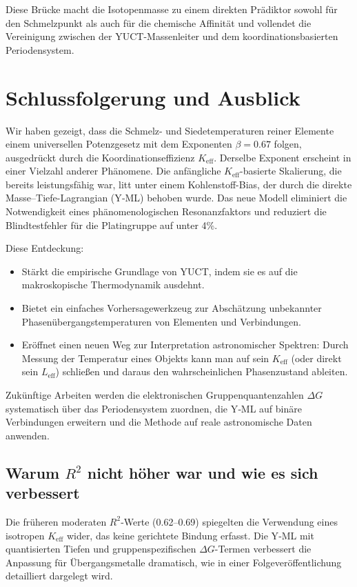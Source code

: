 \documentclass[12pt,a4paper]{article}
\theoremstyle{remark}
\newcommand{\Keff}{K_{\mathrm{eff}}}
\newcommand{\be}{\beta}               %
\begin{document}
	Diese Brücke macht die Isotopenmasse zu einem direkten Prädiktor sowohl für den Schmelzpunkt als auch für die chemische Affinität und vollendet die Vereinigung zwischen der YUCT-Massenleiter und dem koordinationsbasierten Periodensystem.
	
	\section{Schlussfolgerung und Ausblick}
	Wir haben gezeigt, dass die Schmelz- und Siedetemperaturen reiner Elemente einem universellen Potenzgesetz mit dem Exponenten \(\be = 0.67\) folgen, ausgedrückt durch die Koordinationseffizienz \(\Keff\). Derselbe Exponent erscheint in einer Vielzahl anderer Phänomene. Die anfängliche \(K_{\mathrm{eff}}\)-basierte Skalierung, die bereits leistungsfähig war, litt unter einem Kohlenstoff-Bias, der durch die direkte Masse–Tiefe-Lagrangian (Y‑ML) behoben wurde. Das neue Modell eliminiert die Notwendigkeit eines phänomenologischen Resonanzfaktors und reduziert die Blindtestfehler für die Platingruppe auf unter 4\%.
	
	Diese Entdeckung:
	\begin{itemize}
		\item Stärkt die empirische Grundlage von YUCT, indem sie es auf die makroskopische Thermodynamik ausdehnt.
		\item Bietet ein einfaches Vorhersagewerkzeug zur Abschätzung unbekannter Phasenübergangstemperaturen von Elementen und Verbindungen.
		\item Eröffnet einen neuen Weg zur Interpretation astronomischer Spektren: Durch Messung der Temperatur eines Objekts kann man auf sein \(\Keff\) (oder direkt sein \(L_{\mathrm{eff}}\)) schließen und daraus den wahrscheinlichen Phasenzustand ableiten.
	\end{itemize}
	Zukünftige Arbeiten werden die elektronischen Gruppenquantenzahlen \(\Delta G\) systematisch über das Periodensystem zuordnen, die Y‑ML auf binäre Verbindungen erweitern und die Methode auf reale astronomische Daten anwenden.
	
	\subsection{Warum \(R^2\) nicht höher war und wie es sich verbessert}
	Die früheren moderaten \(R^2\)-Werte (0.62–0.69) spiegelten die Verwendung eines isotropen \(K_{\mathrm{eff}}\) wider, das keine gerichtete Bindung erfasst. Die Y‑ML mit quantisierten Tiefen und gruppenspezifischen \(\Delta G\)-Termen verbessert die Anpassung für Übergangsmetalle dramatisch, wie in einer Folgeveröffentlichung detailliert dargelegt wird.
	
\end{document}
